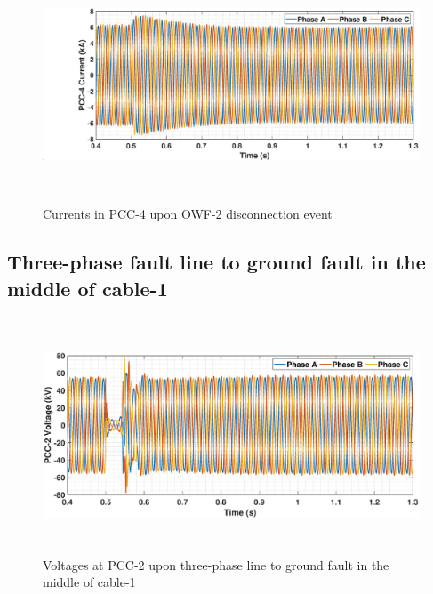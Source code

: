 \begin{figure}[H]
    \includegraphics[height = 7cm,width = \textwidth]{Diagrams/Appendix_C/IABC_WT4_WT2off.eps}
    \caption{Currents in PCC-4 upon OWF-2 disconnection event}
    \label{IABC_WT4_WT2off}
\end{figure}

\subsection{Three-phase fault line to ground fault in the middle of cable-1}

\begin{figure}[H]
    \includegraphics[height = 7cm,width = \textwidth]{Diagrams/Appendix_C/VABC_WT2_3phaseSC.eps}
    \caption{Voltages at PCC-2 upon three-phase line to ground fault in the middle of cable-1}
    \label{VABC_WT2_3phaseSC}
\end{figure}

